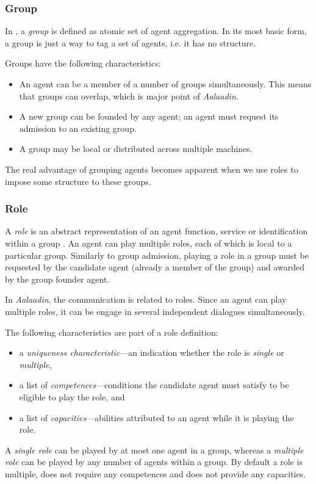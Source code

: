 \subsubsection*{Group}

In \cite{Ferber97}, a \textit{group} is defined as atomic set of agent aggregation.
In its most basic form, a group is just a way to tag a set of agents, i.e. it has no structure.

Groups have the following characteristics:
\begin{itemize}
	\item An agent can be a member of a number of groups simultaneously.
	This means that groups can overlap, which is major point of \textit{Aalaadin}.
	\item A new group can be founded by any agent; an agent must request its admission to an existing group.
	\item A group may be local or distributed across multiple machines.
\end{itemize}

The real advantage of grouping agents becomes apparent when we use roles to impose some structure to these groups.

\subsubsection*{Role}

A \textit{role} is an abstract representation of an agent function, service or identification within a group \cite{Ferber97}.
An agent can play multiple roles, each of which is local to a particular group.
Similarly to group admission, playing a role in a group must be requested by the candidate agent (already a member of the group) and awarded by the group founder agent.

In \textit{Aalaadin}, the communication is related to roles. Since an agent can play multiple roles, it can be engage in several independent dialogues simultaneously.

The following characteristics are part of a role definition:
\begin{itemize}
	\item a \textit{uniqueness characteristic}---an indication whether the role is \textit{single} or \textit{multiple},
	\item a list of  \textit{competences}---conditions the candidate agent must satisfy to be eligible to play the role, and
	\item a list of \textit{capacities}---abilities attributed to an agent while it is playing the role.
\end{itemize}
A \textit{single role} can be played by at most one agent in a group, whereas a \textit{multiple role} can be played by any number of agents within a group.
By default a role is multiple, does not require any competences and does not provide any capacities.

